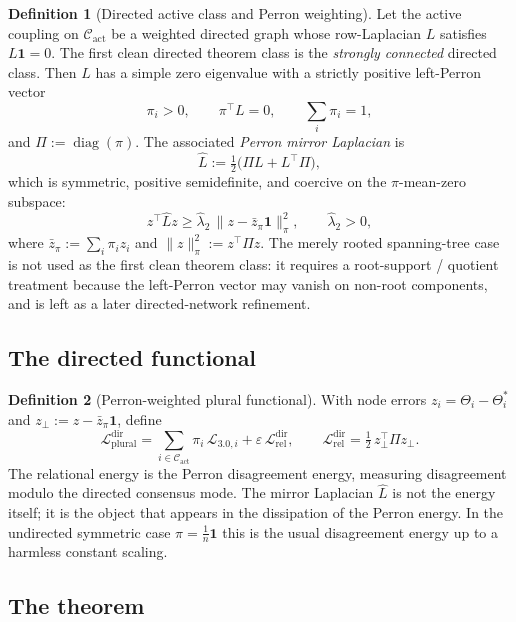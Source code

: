 \documentclass[11pt,a4paper]{article}
\theoremstyle{definition}
\newtheorem{definition}{Definition}[section]
\theoremstyle{plain}
\theoremstyle{remark}
\begin{document}
\begin{definition}[Directed active class and Perron weighting]\label{def:directed}
Let the active coupling on \(\mathcal C_{\mathrm{act}}\) be a weighted directed graph whose
row-Laplacian \(L\) satisfies \(L\mathbf 1=0\). The first clean directed theorem class is the
\emph{strongly connected} directed class. Then \(L\) has a simple zero eigenvalue with a
strictly positive left-Perron vector
\[
\pi_i>0,
\qquad
\pi^\top L=0,
\qquad
\textstyle\sum_i\pi_i=1,
\]
and \(\Pi:=\operatorname{diag}(\pi)\). The associated \emph{Perron mirror Laplacian} is
\[
\widehat L:=\tfrac12\bigl(\Pi L+L^\top\Pi\bigr),
\]
which is symmetric, positive semidefinite, and coercive on the \(\pi\)-mean-zero subspace:
\[
z^\top\widehat Lz
\ge
\widehat\lambda_2\,\lVert z-\bar z_\pi\mathbf 1\rVert_\pi^2,
\qquad
\widehat\lambda_2>0,
\]
where \(\bar z_\pi:=\sum_i\pi_i z_i\) and \(\lVert z\rVert_\pi^2:=z^\top\Pi z\). The merely
rooted spanning-tree case is not used as the first clean theorem class: it requires a
root-support / quotient treatment because the left-Perron vector may vanish on non-root
components, and is left as a later directed-network refinement.
\end{definition}

\subsection{The directed functional}

\begin{definition}[Perron-weighted plural functional]\label{def:dir-lyap}
With node errors \(z_i=\Theta_i-\Theta_i^*\) and \(z_\perp:=z-\bar z_\pi\mathbf 1\), define
\[
\boxed{\;
\mathcal L_{\mathrm{plural}}^{\mathrm{dir}}
=
\sum_{i\in\mathcal C_{\mathrm{act}}}\pi_i\,\mathcal L_{3.0,i}
+
\varepsilon\,\mathcal L_{\mathrm{rel}}^{\mathrm{dir}},
\qquad
\mathcal L_{\mathrm{rel}}^{\mathrm{dir}}
=
\tfrac12\,z_\perp^\top\Pi z_\perp .
\;}
\]
The relational energy is the Perron disagreement energy, measuring disagreement modulo the
directed consensus mode. The mirror Laplacian \(\widehat L\) is not the energy itself; it is
the object that appears in the dissipation of the Perron energy. In the undirected symmetric
case \(\pi=\tfrac1n\mathbf 1\) this is the usual disagreement energy up to a harmless
constant scaling.
\end{definition}

\subsection{The theorem}
\end{document}
